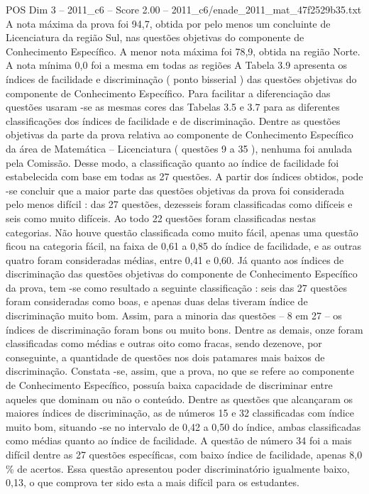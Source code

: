 \begin{textsample}{POS Dim 3 – 2011\_c6 – Score 2.00 – 2011\_c6/enade\_2011\_mat\_47f2529b35.txt}
A nota máxima da prova foi 94,7, obtida por pelo menos um concluinte de Licenciatura da região Sul, nas questões objetivas do componente de Conhecimento Específico.
A menor nota máxima foi 78,9, obtida na região Norte.
A nota mínima 0,0 foi a mesma em todas as regiões A Tabela 3.9 apresenta os índices de facilidade e discriminação ( ponto bisserial ) das questões objetivas do componente de Conhecimento Específico.
Para facilitar a diferenciação das questões usaram -se as mesmas cores das Tabelas 3.5 e 3.7 para as diferentes classificações dos índices de facilidade e de discriminação.
Dentre as questões objetivas da parte da prova relativa ao componente de Conhecimento Específico da área de Matemática – Licenciatura ( questões 9 a 35 ), nenhuma foi anulada pela Comissão.
Desse modo, a classificação quanto ao índice de facilidade foi estabelecida com base em todas as 27 questões.
A partir dos índices obtidos, pode -se concluir que a maior parte das questões objetivas da prova foi considerada pelo menos difícil : das 27 questões, dezesseis foram classificadas como difíceis e seis como muito difíceis.
Ao todo 22 questões foram classificadas nestas categorias.
Não houve questão classificada como muito fácil, apenas uma questão ficou na categoria fácil, na faixa de 0,61 a 0,85 do índice de facilidade, e as outras quatro foram consideradas médias, entre 0,41 e 0,60.
Já quanto aos índices de discriminação das questões objetivas do componente de Conhecimento Específico da prova, tem -se como resultado a seguinte classificação : seis das 27 questões foram consideradas como boas, e apenas duas delas tiveram índice de discriminação muito bom.
Assim, para a minoria das questões – 8 em 27 – os índices de discriminação foram bons ou muito bons.
Dentre as demais, onze foram classificadas como médias e outras oito como fracas, sendo dezenove, por conseguinte, a quantidade de questões nos dois patamares mais baixos de discriminação.
Constata -se, assim, que a prova, no que se refere ao componente de Conhecimento Específico, possuía baixa capacidade de discriminar entre aqueles que dominam ou não o conteúdo.
Dentre as questões que alcançaram os maiores índices de discriminação, as de números 15 e 32 classificadas com índice muito bom, situando -se no intervalo de 0,42 a 0,50 do índice, ambas classificadas como médias quanto ao índice de facilidade.
A questão de número 34 foi a mais difícil dentre as 27 questões específicas, com baixo índice de facilidade, apenas 8,0 \% de acertos.
Essa questão apresentou poder discriminatório igualmente baixo, 0,13, o que comprova ter sido esta a mais difícil para os estudantes.

\end{textsample}
